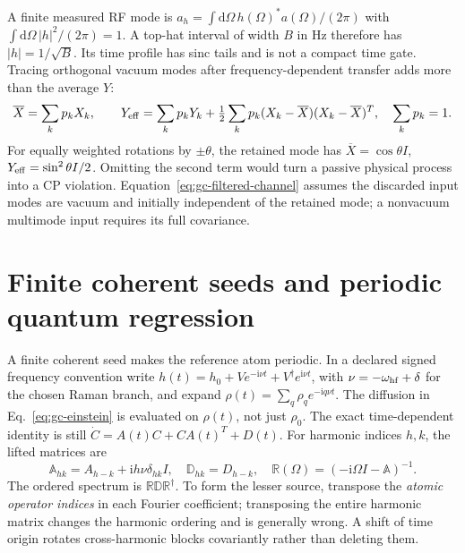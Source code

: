\documentclass[11pt,a4paper]{article}
\newcommand{\dd}{\mathrm d}
\newcommand{\ii}{\mathrm i}
\begin{document}
A finite measured RF mode is
$a_h=\int\dd\Omega\,h(\Omega)^*a(\Omega)/(2\pi)$ with
$\int\dd\Omega\,|h|^2/(2\pi)=1$. A top-hat interval of width $B$ in Hz
therefore has $|h|=1/\sqrt B$. Its time profile has sinc tails and is not a
compact time gate. Tracing orthogonal vacuum modes after frequency-dependent
transfer adds more than the average $Y$:
\begin{equation}
 \overline X=\sum_kp_kX_k,\qquad
 Y_{\rm eff}=\sum_kp_kY_k+\tfrac12\sum_kp_k
             (X_k-\overline X)(X_k-\overline X)^T,
 \quad\sum_kp_k=1.
 \label{eq:gc-filtered-channel}
\end{equation}
For equally weighted rotations by $\pm\theta$, the retained mode has
$\overline X=\cos\theta I$, $Y_{\rm eff}=\sin^2\theta I/2$. Omitting the
second term would turn a passive physical process into a CP violation.
Equation~\eqref{eq:gc-filtered-channel} assumes the discarded input modes are
vacuum and initially independent of the retained mode; a nonvacuum multimode
input requires its full covariance.

\section{Finite coherent seeds and periodic quantum regression}
\label{sec:gc-periodic}

A finite coherent seed makes the reference atom periodic. In a declared signed
frequency convention write $h(t)=h_0+Ve^{-\ii\nu t}+V^\dagger e^{\ii\nu t}$,
with $\nu=-\omega_{\rm hf}+\delta$ for the chosen Raman branch, and expand
$\rho(t)=\sum_q\rho_qe^{-\ii q\nu t}$. The diffusion in
Eq.~\eqref{eq:gc-einstein} is evaluated on $\rho(t)$, not just $\rho_0$.
The exact time-dependent identity is still
$\dot C=A(t)C+CA(t)^T+D(t)$.
For harmonic indices $h,k$, the lifted matrices are
\begin{equation}
 \mathbb A_{hk}=A_{h-k}+\ii h\nu\delta_{hk}I,\quad
 \mathbb D_{hk}=D_{h-k},\quad
 \mathbb R(\Omega)=(-\ii\Omega I-\mathbb A)^{-1}.
 \label{eq:gc-lifted-generator}
\end{equation}
The ordered spectrum is $\mathbb R\mathbb D\mathbb R^\dagger$. To form the
lesser source, transpose the \emph{atomic operator indices} in each Fourier
coefficient; transposing the entire harmonic matrix changes the harmonic
ordering and is generally wrong. A shift of time origin rotates cross-harmonic
blocks covariantly rather than deleting them.
\end{document}
